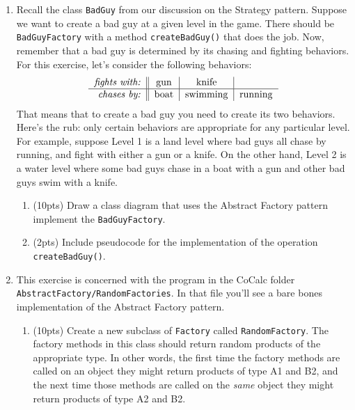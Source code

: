 \documentclass[11pt]{article}
\newlength{\up}\setlength{\up}{-\baselineskip}
\begin{document}
\begin{enumerate}
  \item Recall the class \texttt{BadGuy} from our discussion on the Strategy pattern. Suppose we want to create a bad guy at a given level in the game. There should be \texttt{BadGuyFactory} with a method \texttt{createBadGuy()} that does the job. Now, remember that a bad guy is determined by its chasing and fighting behaviors. For this exercise, let's consider the following behaviors:
  \[
      \begin{tabular}{r||c|c|c}
        \emph{fights with:} & gun   & knife     &  \\\hline
        \emph{chases by:}   & boat  & swimming & running
      \end{tabular}
  \]
  That means that to create a bad guy you need to create its two behaviors. Here's the rub: only certain behaviors are appropriate for any particular level. For example, suppose Level 1 is a land level where bad guys all chase by running, and fight with either a gun or a knife. On the other hand, Level 2 is a water level where some bad guys chase in a boat with a gun and other bad guys swim with a knife. 

  \begin{enumerate}

    \item (10pts) Draw a class diagram that uses the Abstract Factory pattern implement the \texttt{BadGuyFactory}.

    \item (2pts) Include pseudocode for the implementation of the operation \texttt{createBadGuy()}.

  \end{enumerate}

  \vfill

\newpage

  \item This exercise is concerned with the program in the CoCalc folder \texttt{AbstractFactory/RandomFactories}. In that file you'll see a bare bones implementation of the Abstract Factory pattern. 

  \begin{enumerate}

    \item (10pts) Create a new subclass of \texttt{Factory} called \texttt{RandomFactory}. The factory methods in this class should return random products of the appropriate type. In other words, the first time the factory methods are called on an object they might return products of type A1 and B2, and the next time those methods are called on the \emph{same} object they might return products of type A2 and B2.


\end{enumerate}
\end{enumerate}
\end{document}
